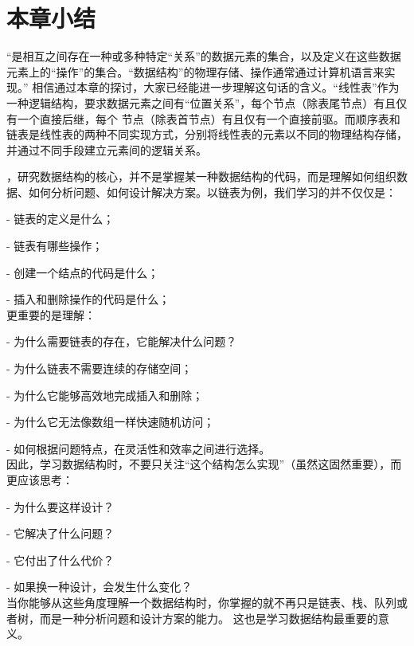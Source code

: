 \section{本章小结}
“是相互之间存在一种或多种特定“关系”的数据元素的集合，以及定义在这些数据元素上的“操作”的集合。“数据结构”的物理存储、操作通常通过计算机语言来实现。”
相信通过本章的探讨，大家已经能进一步理解这句话的含义。“线性表”作为一种逻辑结构，要求数据元素之间有“位置关系”，每个节点（除表尾节点）有且仅有一个直接后继，每个
节点（除表首节点）有且仅有一个直接前驱。而顺序表和链表是线性表的两种不同实现方式，分别将线性表的元素以不同的物理结构存储，并通过不同手段建立元素间的逻辑关系。

，研究数据结构的核心，并不是掌握某一种数据结构的代码，而是理解如何组织数据、如何分析问题、如何设计解决方案。以链表为例，我们学习的并不仅仅是：

-  链表的定义是什么；

-  链表有哪些操作；

-  创建一个结点的代码是什么； 

-  插入和删除操作的代码是什么； \\
更重要的是理解：

-  为什么需要链表的存在，它能解决什么问题？

-  为什么链表不需要连续的存储空间； 

-  为什么它能够高效地完成插入和删除；   

-  为什么它无法像数组一样快速随机访问； 

-  如何根据问题特点，在灵活性和效率之间进行选择。 \\
因此，学习数据结构时，不要只关注“这个结构怎么实现”（虽然这固然重要），而更应该思考：

-  为什么要这样设计？

-  它解决了什么问题？

-  它付出了什么代价？

-  如果换一种设计，会发生什么变化？\\
当你能够从这些角度理解一个数据结构时，你掌握的就不再只是链表、栈、队列或者树，而是一种分析问题和设计方案的能力。
这也是学习数据结构最重要的意义。



